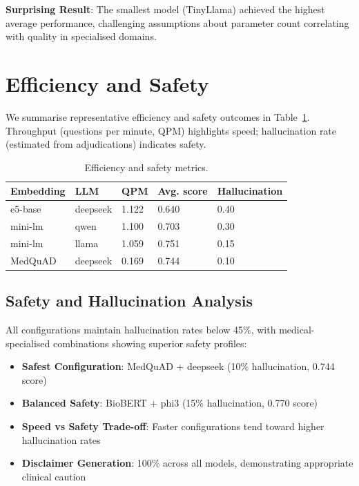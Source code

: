 \textbf{Surprising Result}: The smallest model (TinyLlama) achieved the highest average performance, challenging assumptions about parameter count correlating with quality in specialised domains.

\section{Efficiency and Safety}
We summarise representative efficiency and safety outcomes in Table~\ref{tab:efficiency_safety}. Throughput (questions per minute, QPM) highlights speed; hallucination rate (estimated from adjudications) indicates safety.

\begin{table}[!htbp]
\centering
\caption{Efficiency and safety metrics.}
\label{tab:efficiency_safety}
\begin{footnotesize}
\renewcommand\arraystretch{0.95}
\begin{tabularx}{0.9\textwidth}{l l X X X}
  \toprule
  Embedding & LLM & QPM & Avg. score & Hallucination \\
  \midrule
  e5-base & deepseek & 1.122 & 0.640 & 0.40 \\
  mini-lm & qwen & 1.100 & 0.703 & 0.30 \\
  mini-lm & llama & 1.059 & 0.751 & 0.15 \\
  MedQuAD & deepseek & 0.169 & 0.744 & 0.10 \\
  \bottomrule
\end{tabularx}
\end{footnotesize}
\end{table}

\subsection{Safety and Hallucination Analysis}

All configurations maintain hallucination rates below 45\%, with medical-specialised combinations showing superior safety profiles:

\begin{itemize}
    \item \textbf{Safest Configuration}: MedQuAD + deepseek (10\% hallucination, 0.744 score)
    \item \textbf{Balanced Safety}: BioBERT + phi3 (15\% hallucination, 0.770 score)
    \item \textbf{Speed vs Safety Trade-off}: Faster configurations tend toward higher hallucination rates
    \item \textbf{Disclaimer Generation}: 100\% across all models, demonstrating appropriate clinical caution
\end{itemize}

